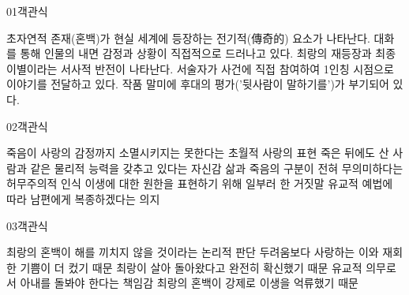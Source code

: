 \documentclass[fs85,seriesWit]{korfarm-base}
\begin{document}
\kfBeginMC
\begin{kfQBlock}{01}{객관식}
\begin{kfChoices}
\kfChoice 초자연적 존재(혼백)가 현실 세계에 등장하는 전기적(傳奇的) 요소가 나타난다.
\kfChoice 대화를 통해 인물의 내면 감정과 상황이 직접적으로 드러나고 있다.
\kfChoice 최랑의 재등장과 최종 이별이라는 서사적 반전이 나타난다.
\kfChoice 서술자가 사건에 직접 참여하여 1인칭 시점으로 이야기를 전달하고 있다.
\kfChoice 작품 말미에 후대의 평가('뒷사람이 말하기를')가 부기되어 있다.
\end{kfChoices}
\end{kfQBlock}

\begin{kfQBlock}{02}{객관식}
\begin{kfChoices}
\kfChoice 죽음이 사랑의 감정까지 소멸시키지는 못한다는 초월적 사랑의 표현
\kfChoice 죽은 뒤에도 산 사람과 같은 물리적 능력을 갖추고 있다는 자신감
\kfChoice 삶과 죽음의 구분이 전혀 무의미하다는 허무주의적 인식
\kfChoice 이생에 대한 원한을 표현하기 위해 일부러 한 거짓말
\kfChoice 유교적 예법에 따라 남편에게 복종하겠다는 의지
\end{kfChoices}
\end{kfQBlock}

\begin{kfQBlock}{03}{객관식}
\begin{kfChoices}
\kfChoice 최랑의 혼백이 해를 끼치지 않을 것이라는 논리적 판단
\kfChoice 두려움보다 사랑하는 이와 재회한 기쁨이 더 컸기 때문
\kfChoice 최랑이 살아 돌아왔다고 완전히 확신했기 때문
\kfChoice 유교적 의무로서 아내를 돌봐야 한다는 책임감
\kfChoice 최랑의 혼백이 강제로 이생을 억류했기 때문
\end{kfChoices}
\end{kfQBlock}
\end{document}
